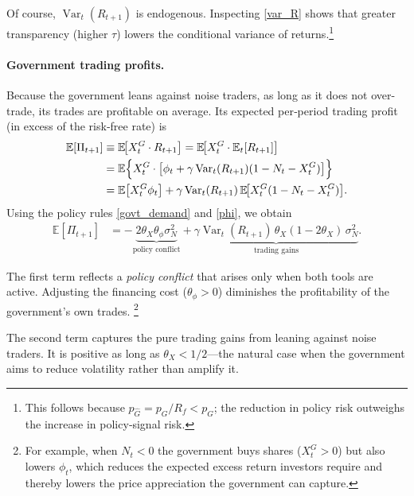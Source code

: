 \documentclass[12pt]{article}
\begin{document}
Of course, \(\operatorname{Var}_t(R_{t+1})\) is endogenous.  Inspecting \eqref{var_R} shows that greater transparency (higher \(\tau\)) lowers the conditional variance of returns.\footnote{This follows because \(p_{\hat{G}} = p_G/R_f < p_G\); the reduction in policy risk outweighs the increase in policy‑signal risk.}

\paragraph{Government trading profits.}

Because the government leans against noise traders, as long as it does not over-trade, its trades are profitable on average.  Its expected per‑period trading profit (in excess of the risk‑free rate) is
\begin{align*}
    \mathbb{E}[\Pi_{t+1}] &\equiv \mathbb{E}\!\bigl[ X_t^G \cdot R_{t+1} \bigr] 
                          = \mathbb{E}\!\bigl[ X_t^G \cdot \mathbb{E}_t[R_{t+1}] \bigr] \\
    &= \mathbb{E}\Bigl\{ X_t^G \cdot 
        \bigl[ \phi_t + \gamma \operatorname{Var}_t(R_{t+1}) (1 - N_t - X_t^G) \bigr] \Bigr\} \\
    &= \mathbb{E}\bigl[ X_t^G \phi_t \bigr] 
       + \gamma \operatorname{Var}_t(R_{t+1}) \,
         \mathbb{E}\!\bigl[ X_t^G (1 - N_t - X_t^G) \bigr].
\end{align*}
Using the policy rules \eqref{govt_demand} and \eqref{phi}, we obtain
\begin{align}
    \mathbb{E}[\Pi_{t+1}] 
    &= - \underbrace{2\theta_X\theta_\phi\sigma_N^2}_{\text{policy conflict}}
       + \underbrace{\gamma \operatorname{Var}_t(R_{t+1}) \,
                     \theta_X (1-2\theta_X)\,\sigma_N^2}_{\text{trading gains}} .
    \label{govt_profit}
\end{align}

The first term reflects a \emph{policy conflict} that arises only when both tools are active.  
Adjusting the financing cost (\(\theta_\phi > 0\)) diminishes the profitability of the government's own trades.%
\footnote{For example, when \(N_t<0\) the government buys shares (\(X_t^G>0\)) but also lowers \(\phi_t\), which reduces the expected excess return investors require and thereby lowers the price appreciation the government can capture.}

The second term captures the pure trading gains from leaning against noise traders.  
It is positive as long as \(\theta_X < 1/2\)—the natural case when the government aims to reduce volatility rather than amplify it.  
\end{document}
